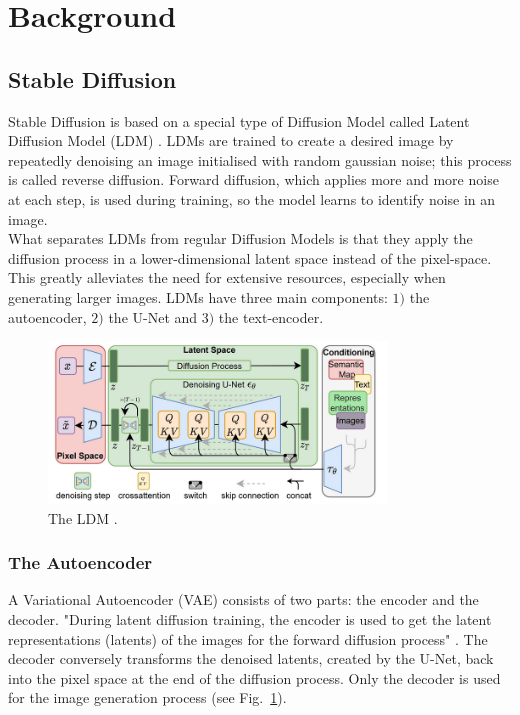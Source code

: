 \section{Background} \label{backgorund}



\subsection{Stable Diffusion}
Stable Diffusion is based on a special type of Diffusion Model called Latent Diffusion Model (LDM) \cite{Rombach_2022_CVPR}. LDMs are trained to create a desired image by repeatedly denoising an image initialised with random gaussian noise; this process is called reverse diffusion. Forward diffusion, which applies more and more noise at each step, is used during training, so the model learns to identify noise in an image.\\
What separates LDMs from regular Diffusion Models is that they apply the diffusion process in a lower-dimensional latent space instead of the pixel-space. This greatly alleviates the need for extensive resources, especially when generating larger images. LDMs have three main components: \(1)\) the autoencoder, \(2)\) the U-Net and \(3)\) the text-encoder.
\begin{figure}[!htb]
\centering
\includegraphics[width=0.8\textwidth]
{static/LDM.png}
\caption{The LDM \cite[Fig.~3]{Rombach_2022_CVPR}.}
\label{fig:ldm}
\end{figure}



\subsubsection{The Autoencoder}
A Variational Autoencoder (VAE) consists of two parts: the encoder and the decoder. "During latent diffusion training, the encoder is used to get the latent representations (latents) of the images for the forward diffusion process" \cite{patil2022stable}. The decoder conversely transforms the denoised latents, created by the U-Net, back into the pixel space at the end of the diffusion process. Only the decoder is used for the image generation process (see Fig.~\ref{fig:ldm}).



